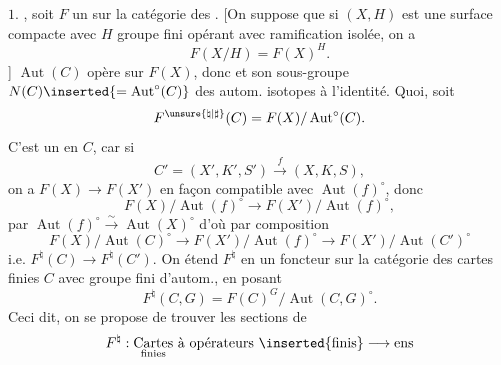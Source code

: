 $1.$ 
, soit $F$ un  sur la catégorie des
.
[On suppose que si $(X,H)$ est une surface compacte avec $H$ groupe fini opérant avec ramification isolée, on a
\[
F(X/H)=F(X)^H.
\]
]
$\operatorname{Aut}(C)$ opère sur $F(X)$, donc et son sous-groupe $N(C)\inserted{=\operatorname{Aut}^\circ(C)}$ des autom. isotopes à l’identité.
Quoi, soit
\[
F^{\unsure{\natural|\sharp}}(C)=F(X)/\operatorname{Aut}^\circ(C).
\]
C’est un  en $C$, car si
\[
C'=(X',K',S')\xrightarrow{f}(X,K,S),
\]
on a $F(X)\to F(X')$ 
en façon compatible avec $\operatorname{Aut}(f)^\circ$, donc
\[
F(X)/\operatorname{Aut}(f)^\circ\longrightarrow F(X')/\operatorname{Aut}(f)^\circ,
\]
par $\operatorname{Aut}(f)^\circ\xrightarrow{\sim}\operatorname{Aut}(X)^\circ$ d’où par composition
\[
F(X)/\operatorname{Aut}(C)^\circ\longrightarrow F(X')/\operatorname{Aut}(f)^\circ
\longrightarrow F(X')/\operatorname{Aut}(C')^\circ
\]
i.e. $F^\natural(C)\to F^\natural(C')$.
On étend $F^\natural$ en un foncteur sur la catégorie des cartes finies $C$ avec groupe fini d’autom., en posant
\[
F^\natural(C,G)=F(C)^G/\operatorname{Aut}(C,G)^\circ.
\]
Ceci dit, on se propose de trouver les sections de 
\[
F^\natural:\underset{\text{finies}}{\text{Cartes}}\ \text{à opérateurs}\ \inserted{\text{finis}}\longrightarrow\text{ens}
\]
